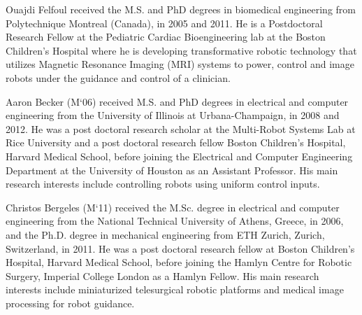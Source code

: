 \documentclass[journal]{IEEEtran}
\begin{document}
\begin{IEEEbiography}{Ouajdi Felfoul} received the M.S. and PhD degrees in biomedical engineering from Polytechnique Montreal (Canada), in 2005 and 2011. He is a Postdoctoral Research Fellow at the Pediatric Cardiac Bioengineering lab at the Boston Children’s Hospital where he is developing transformative robotic technology that utilizes Magnetic Resonance Imaging (MRI) systems to power, control and image robots under the guidance and control of a clinician.
\end{IEEEbiography}
\begin{IEEEbiography}{Aaron Becker}
 (M`06) received M.S. and PhD degrees in electrical and computer engineering from the University of Illinois at Urbana-Champaign, in 2008 and 2012. He was a post doctoral research scholar at the Multi-Robot Systems Lab at Rice University and a post doctoral research fellow Boston Children's Hospital, Harvard Medical School, before joining the Electrical and Computer Engineering Department at the University of Houston as an Assistant Professor. His main research interests include controlling robots using uniform control inputs.
\end{IEEEbiography}
\begin{IEEEbiography}{Christos Bergeles}
 (M`11) received the M.Sc. degree in electrical and computer engineering from the National Technical University of Athens, Greece, in 2006, and the Ph.D. degree in mechanical engineering from ETH Zurich, Zurich, Switzerland, in 2011. He was a post doctoral research fellow at Boston Children's Hospital, Harvard Medical School, before joining the Hamlyn Centre for Robotic Surgery, Imperial College London as a Hamlyn Fellow. His main research interests include miniaturized telesurgical robotic platforms and medical image processing for robot guidance.
\end{IEEEbiography}
\end{document}
